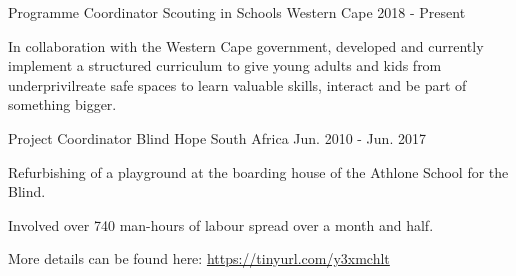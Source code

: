 

\begin{cventries}
\cventry
{Programme Coordinator} %
{Scouting in Schools} %
{Western Cape} %
{2018 - Present} %
{
  \begin{cvitems} %
    \item {In collaboration with the Western Cape government, developed and currently implement a structured curriculum to give young adults and kids from underprivilreate safe spaces to learn valuable skills, interact and be part of something bigger.}
  \end{cvitems}
}


  \cventry
    {Project Coordinator} %
    {Blind Hope} %
    {South Africa} %
    {Jun. 2010 - Jun. 2017} %
    {
      \begin{cvitems} %
        \item {Refurbishing of a playground at the boarding house of the Athlone School for the Blind.}
        \item {Involved over 740 man-hours of labour spread over a month and half.}
        \item {More details can be found here: \href{https://tinyurl.com/y3xmchlt}{https://tinyurl.com/y3xmchlt}}
      \end{cvitems}
    }


\end{cventries}

